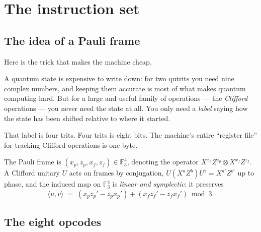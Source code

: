 \section{The instruction set}\label{sec:isa}

\subsection{The idea of a Pauli frame}

\begin{plain}
Here is the trick that makes the machine cheap.

A quantum state is expensive to write down: for two qutrits you need nine complex
numbers, and keeping them accurate is most of what makes quantum computing hard. But for
a large and useful family of operations --- the \emph{Clifford} operations --- you never
need the state at all. You only need a \emph{label} saying how the state has been shifted
relative to where it started.

That label is four trits. Four trits is eight bits. The machine's entire ``register
file'' for tracking Clifford operations is one byte.
\end{plain}


\begin{spec}
The Pauli frame is $(x_p,z_p,x_f,z_f)\in\mathbb{F}_3^4$, denoting the operator
$X^{x_p}Z^{z_p}\otimes X^{x_f}Z^{z_f}$. A Clifford unitary $U$ acts on frames by
conjugation, $U(X^aZ^b)U^\dagger = X^{a'}Z^{b'}$ up to phase, and the induced map on
$\mathbb{F}_3^4$ is \emph{linear and symplectic}: it preserves
\[
  \langle u,v\rangle \;=\; (x_p z_p' - z_p x_p') + (x_f z_f' - z_f x_f') \bmod 3 .
\]
\end{spec}

\subsection{The eight opcodes}

